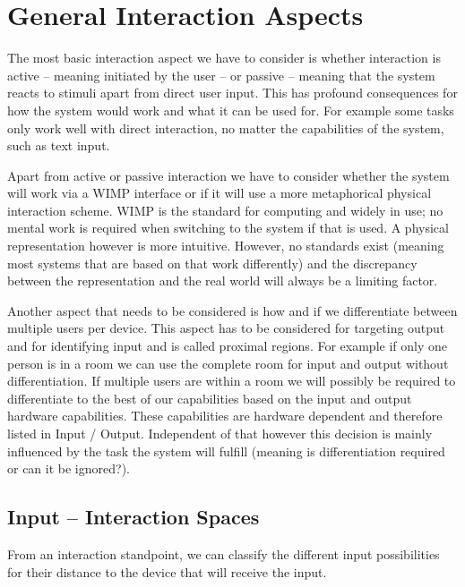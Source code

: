 \documentclass{acm_proc_article-sp}
\begin{document}
\section{General Interaction Aspects}

The most basic interaction aspect we have to consider is whether interaction is active – meaning initiated by the user – or passive – meaning that the system reacts to stimuli apart from direct user input.
This has profound consequences for how the system would work and what it can be used for.
For example some tasks only work well with direct interaction, no matter the capabilities of the system, such as text input.

Apart from active or passive interaction we have to consider whether the system will work via a WIMP interface or if it will use a more metaphorical physical interaction scheme.
WIMP is the standard for computing and widely in use; no mental work is required when switching to the system if that is used.
A physical representation however is more intuitive.
However, no standards exist (meaning most systems that are based on that work differently) and the discrepancy between the representation and the real world will always be a limiting factor.

Another aspect that needs to be considered is how and if we differentiate between multiple users per device.
This aspect has to be considered for targeting output and for identifying input and is called proximal regions.
For example if only one person is in a room we can use the complete room for input and output without differentiation.
If multiple users are within a room we will possibly be required to differentiate to the best of our capabilities based on the input and output hardware capabilities.
These capabilities are hardware dependent and therefore listed in Input / Output.
Independent of that however this decision is mainly influenced by the task the system will fulfill (meaning is differentiation required or can it be ignored?).

\subsection{Input – Interaction Spaces}

From an interaction standpoint, we can classify the different input possibilities for their distance to the device that will receive the input.
\end{document}
